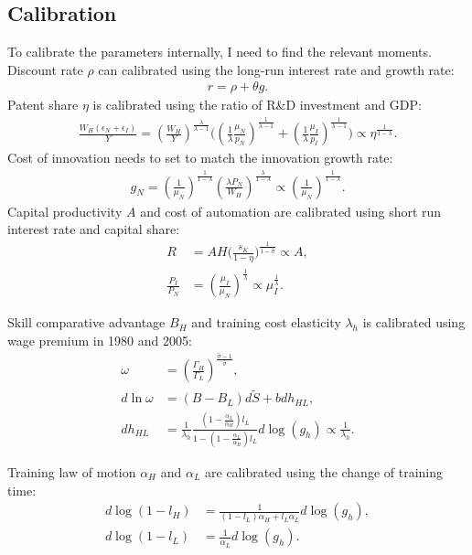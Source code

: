 \documentclass[12pt]{article}
\begin{document}
\begin{appendices}
\section{Calibration}
To calibrate the parameters internally, I need to find the relevant moments. 
Discount rate $\rho$ can calibrated using the long-run interest rate and growth rate:
\begin{align*}
r = \rho+\theta g.
\end{align*}
Patent share $\eta$ is calibrated using the ratio of R\&D investment and GDP:
\begin{align*}
\frac{W_H(\epsilon_N+\epsilon_I)}{Y} = (\frac{W_H}{Y})^{\frac{\lambda}{\lambda-1}}\Big((\frac{1}{\lambda}\frac{\mu_N}{p_N})^{\frac{1}{\lambda-1}}+(\frac{1}{\lambda}\frac{\mu_I}{p_I})^{\frac{1}{\lambda-1}}\Big) \propto \eta^{\frac{1}{1-\lambda}}.
\end{align*}
Cost of innovation needs to set to match the innovation growth rate: 
\begin{align*}
g_N = (\frac{1}{\mu_N})^{\frac{1}{1-\lambda}}(\frac{\lambda P_N}{W_H})^{\frac{\lambda}{1-\lambda}} \propto (\frac{1}{\mu_N})^{\frac{1}{1-\lambda}}.
\end{align*}
Capital productivity $A$ and cost of automation are calibrated using short run interest rate and capital share:
\begin{align*}
R &= AH\Big(\frac{s_K}{1-\eta}\Big)^{\frac{1}{1-\hat{\sigma}}} \propto A, \\
\frac{P_I}{P_N} &=(\frac{\mu_I}{\mu_N})^{\frac{1}{\lambda}} \propto \mu_I^{\frac{1}{\lambda}}.
\end{align*}

Skill comparative advantage $B_H$ and training cost elasticity $\lambda_h$ is calibrated using wage premium in 1980 and 2005: 
\begin{align*}
\omega &= (\frac{\Gamma_H}{\Gamma_L})^{\frac{{\hat{\sigma}}-1}{\hat{\sigma}}}, \\
d \ln \omega &=(B-B_L)d\tilde{S}+bdh_{HL},  \\
dh_{HL} &= \frac{1}{\lambda_h}\frac{(1-\frac{\alpha_L}{\alpha_H})l_L}{1-(1-\frac{\alpha_L}{\alpha_H})l_L}d\log(g_h) \propto \frac{1}{\lambda_h}.
\end{align*}

Training law of motion $\alpha_H$ and $\alpha_L$ are calibrated using the change of training time:
\begin{align*}
d\log(1-l_H) &= \frac{1}{(1-l_L)\alpha_H+l_L\alpha_L}d\log(g_h), \\
d\log(1-l_L) &= \frac{1}{\alpha_L}d\log(g_h).
\end{align*}


\end{appendices}
\end{document}
